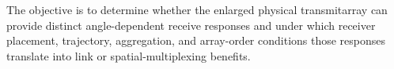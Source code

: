 The objective is to determine whether the enlarged physical
transmitarray can provide distinct angle-dependent receive responses
and under which receiver placement, trajectory, aggregation, and
array-order conditions those responses translate into link or
spatial-multiplexing benefits.



